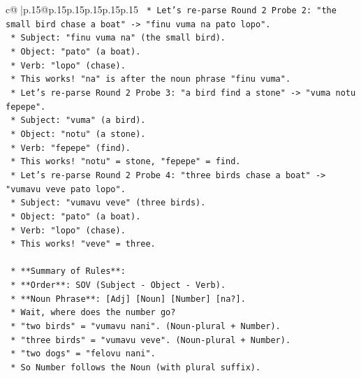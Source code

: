 \documentclass{article}
\begin{document}
{\begin{supertabular}{c@{$\;$}|p{.15\linewidth}@{}p{.15\linewidth}p{.15\linewidth}p{.15\linewidth}p{.15\linewidth}p{.15\linewidth}}
{{{\texttt{            *   Let's re{-}parse Round 2 Probe 2: "the small bird chase a boat" {-}> "finu vuma na pato lopo".} \\
\texttt{                *   Subject: "finu vuma na" (the small bird).} \\
\texttt{                *   Object: "pato" (a boat).} \\
\texttt{                *   Verb: "lopo" (chase).} \\
\texttt{                *   This works! "na" is after the noun phrase "finu vuma".} \\
\texttt{            *   Let's re{-}parse Round 2 Probe 3: "a bird find a stone" {-}> "vuma notu fepepe".} \\
\texttt{                *   Subject: "vuma" (a bird).} \\
\texttt{                *   Object: "notu" (a stone).} \\
\texttt{                *   Verb: "fepepe" (find).} \\
\texttt{                *   This works! "notu" = stone, "fepepe" = find.} \\
\texttt{            *   Let's re{-}parse Round 2 Probe 4: "three birds chase a boat" {-}> "vumavu veve pato lopo".} \\
\texttt{                *   Subject: "vumavu veve" (three birds).} \\
\texttt{                *   Object: "pato" (a boat).} \\
\texttt{                *   Verb: "lopo" (chase).} \\
\texttt{                *   This works! "veve" = three.} \\
\\ 
\texttt{    *   **Summary of Rules**:} \\
\texttt{        *   **Order**: SOV (Subject {-} Object {-} Verb).} \\
\texttt{        *   **Noun Phrase**: {[}Adj{]} {[}Noun{]} {[}Number{]} {[}na?{]}.} \\
\texttt{            *   Wait, where does the number go?} \\
\texttt{            *   "two birds" = "vumavu nani". (Noun{-}plural + Number).} \\
\texttt{            *   "three birds" = "vumavu veve". (Noun{-}plural + Number).} \\
\texttt{            *   "two dogs" = "felovu nani".} \\
\texttt{            *   So Number follows the Noun (with plural suffix).} \\
}}}
\end{supertabular}}
\end{document}
